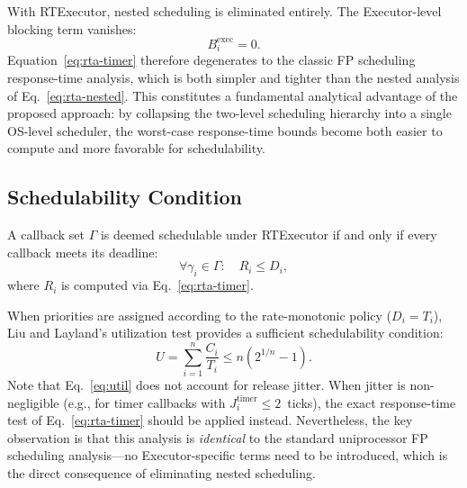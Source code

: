 With RTExecutor, nested scheduling is eliminated entirely.
The Executor-level blocking term vanishes:
\begin{equation}
    B_i^{\mathrm{exec}} = 0.
\end{equation}
Equation~\eqref{eq:rta-timer} therefore degenerates to the classic FP scheduling response-time analysis, which is both simpler and tighter than the nested analysis of Eq.~\eqref{eq:rta-nested}.
This constitutes a fundamental analytical advantage of the proposed approach: by collapsing the two-level scheduling hierarchy into a single OS-level scheduler, the worst-case response-time bounds become both easier to compute and more favorable for schedulability.

\subsection{Schedulability Condition}

A callback set $\Gamma$ is deemed schedulable under RTExecutor if and only if every callback meets its deadline:
\begin{equation}
    \forall \gamma_i \in \Gamma : \quad R_i \leqslant D_i,
    \label{eq:sched}
\end{equation}
where $R_i$ is computed via Eq.~\eqref{eq:rta-timer}.

When priorities are assigned according to the rate-monotonic policy ($D_i = T_i$), Liu and Layland's utilization test provides a sufficient schedulability condition:
\begin{equation}
    U = \sum_{i=1}^{n} \frac{C_i}{T_i} \leqslant n\left(2^{1/n} - 1\right).
    \label{eq:util}
\end{equation}
Note that Eq.~\eqref{eq:util} does not account for release jitter.
When jitter is non-negligible (e.g., for timer callbacks with $J_i^{\mathrm{timer}} \leqslant 2$~ticks), the exact response-time test of Eq.~\eqref{eq:rta-timer} should be applied instead.
Nevertheless, the key observation is that this analysis is \emph{identical} to the standard uniprocessor FP scheduling analysis---no Executor-specific terms need to be introduced, which is the direct consequence of eliminating nested scheduling.
